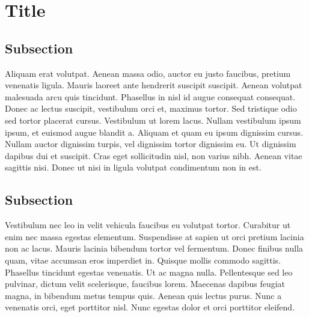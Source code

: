 \section*{Title}
	\subsection*{Subsection}
		Aliquam erat volutpat. Aenean massa odio, auctor eu justo faucibus, pretium venenatis ligula. Mauris laoreet ante hendrerit suscipit suscipit. Aenean volutpat malesuada arcu quis tincidunt. Phasellus in nisl id augue consequat consequat. Donec ac lectus suscipit, vestibulum orci et, maximus tortor. Sed tristique odio sed tortor placerat cursus. Vestibulum ut lorem lacus. Nullam vestibulum ipsum ipsum, et euismod augue blandit a. Aliquam et quam eu ipsum dignissim cursus. Nullam auctor dignissim turpis, vel dignissim tortor dignissim eu. Ut dignissim dapibus dui et suscipit. Cras eget sollicitudin nisl, non varius nibh. Aenean vitae sagittis nisi. Donec ut nisi in ligula volutpat condimentum non in est.
	\subsection*{Subsection}
		Vestibulum nec leo in velit vehicula faucibus eu volutpat tortor. Curabitur ut enim nec massa egestas elementum. Suspendisse at sapien ut orci pretium lacinia non ac lacus. Mauris lacinia bibendum tortor vel fermentum. Donec finibus nulla quam, vitae accumsan eros imperdiet in. Quisque mollis commodo sagittis. Phasellus tincidunt egestas venenatis. Ut ac magna nulla. Pellentesque sed leo pulvinar, dictum velit scelerisque, faucibus lorem. Maecenas dapibus feugiat magna, in bibendum metus tempus quis. Aenean quis lectus purus. Nunc a venenatis orci, eget porttitor nisl. Nunc egestas dolor et orci porttitor eleifend.
